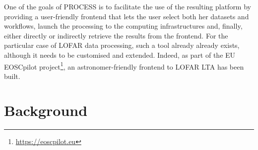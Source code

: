 \documentclass[conference]{IEEEtran}
\begin{document}
One of the goals of PROCESS is to facilitate the use of the resulting platform by providing a user-friendly frontend that lets the user select both her datasets and workflows, launch the processing to the computing infrastructures and, finally, either directly or indirectly retrieve the results from the frontend. For the particular case of LOFAR data processing, such a tool already already exists, although it needs to be customised and extended. Indeed, as part of the EU EOSCpilot project\footnote{\url{https://eoscpilot.eu}}, an astronomer-friendly frontend to LOFAR LTA has been built.

\section{Background}
\end{document}
